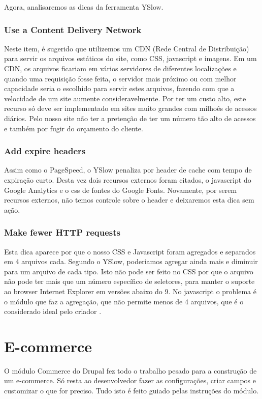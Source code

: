 \documentclass[
	12pt,				%
    oneside,			%
	a4paper,			%
	english,			%
	french,				%
	spanish,			%
	brazil				%
	]{abntex2}
\begin{document}
Agora, analisaremos as dicas da ferramenta YSlow.

\subsubsection{Use a Content Delivery Network}
Neste item, é sugerido que utilizemos um CDN (Rede Central de Distribuição) para servir os arquivos estáticos do site, como CSS, javascript e imagens. Em um CDN, os arquivos ficariam em vários servidores de diferentes localizações e quando uma requisição fosse feita, o servidor mais próximo ou com melhor capacidade seria o escolhido para servir estes arquivos, fazendo com que a velocidade de um site aumente consideravelmente. Por ter um custo alto, este recurso só deve ser implementado em sites muito grandes com milhoês de acessos diários. Pelo nosso site não ter a pretenção de ter um número tão alto de acessos e também por fugir do orçamento do cliente.

\subsubsection{Add expire headers}
Assim como o PageSpeed, o YSlow penaliza por header de cache com tempo de expiração curto. Desta vez dois recursos externos foram citados, o javascript do Google Analytics e o css de fontes do Google Fonts. Novamente, por serem recursos externos, não temos controle sobre o header e deixaremos esta dica sem ação.

\subsubsection{Make fewer HTTP requests}
Esta dica aparece por que o nosso CSS e Javascript foram agregados e separados em 4 arquivos cada. Segundo o YSlow, poderiamos agregar ainda mais e diminuir para um arquivo de cada tipo. Isto não pode ser feito no CSS por que o arquivo não pode ter mais que um número específico de seletores, para manter o suporte ao browser Internet Explorer em versões abaixo do 9. No javascript o problema é o módulo que faz a agregação, que não permite menos de 4 arquivos, que é o considerado ideal pelo criador \cite{AdvAgg}.

\section{E-commerce}
O módulo Commerce do Drupal fez todo o trabalho pesado para a construção de um e-commerce. Só resta ao desenvolvedor fazer as configurações, criar campos e customizar o que for preciso. Tudo isto é feito guiado pelas instruções do módulo.
\end{document}
